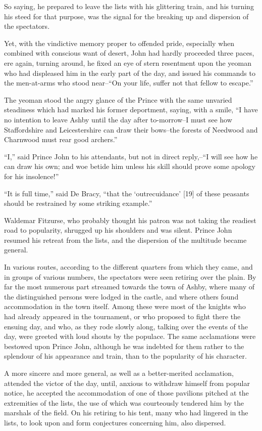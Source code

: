 So saying, he prepared to leave the lists with his glittering train, and
his turning his steed for that purpose, was the signal for the breaking
up and dispersion of the spectators.

Yet, with the vindictive memory proper to offended pride, especially
when combined with conscious want of desert, John had hardly proceeded
three paces, ere again, turning around, he fixed an eye of stern
resentment upon the yeoman who had displeased him in the early part of
the day, and issued his commands to the men-at-arms who stood near--``On
your life, suffer not that fellow to escape.''

The yeoman stood the angry glance of the Prince with the same unvaried
steadiness which had marked his former deportment, saying, with a smile,
``I have no intention to leave Ashby until the day after to-morrow--I
must see how Staffordshire and Leicestershire can draw their bows--the
forests of Needwood and Charnwood must rear good archers.''

``I,'' said Prince John to his attendants, but not in direct reply,--``I
will see how he can draw his own; and woe betide him unless his skill
should prove some apology for his insolence!''

``It is full time,'' said De Bracy, ``that the `outrecuidance' {[}19{]}
of these peasants should be restrained by some striking example.''

Waldemar Fitzurse, who probably thought his patron was not taking the
readiest road to popularity, shrugged up his shoulders and was silent.
Prince John resumed his retreat from the lists, and the dispersion of
the multitude became general.

In various routes, according to the different quarters from which they
came, and in groups of various numbers, the spectators were seen
retiring over the plain. By far the most numerous part streamed towards
the town of Ashby, where many of the distinguished persons were lodged
in the castle, and where others found accommodation in the town itself.
Among these were most of the knights who had already appeared in the
tournament, or who proposed to fight there the ensuing day, and who, as
they rode slowly along, talking over the events of the day, were greeted
with loud shouts by the populace. The same acclamations were bestowed
upon Prince John, although he was indebted for them rather to the
splendour of his appearance and train, than to the popularity of his
character.

A more sincere and more general, as well as a better-merited
acclamation, attended the victor of the day, until, anxious to withdraw
himself from popular notice, he accepted the accommodation of one of
those pavilions pitched at the extremities of the lists, the use of
which was courteously tendered him by the marshals of the field. On his
retiring to his tent, many who had lingered in the lists, to look upon
and form conjectures concerning him, also dispersed.

